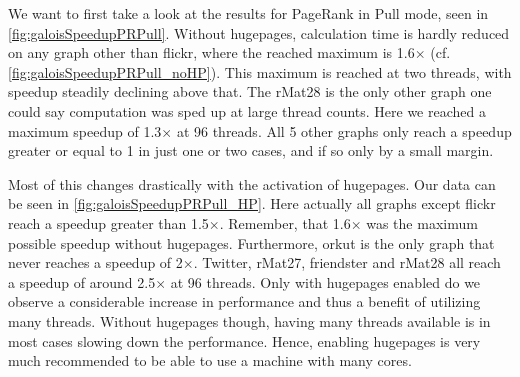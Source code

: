 We want to first take a look at the results for PageRank in Pull mode, seen in \autoref{fig:galoisSpeedupPRPull}. Without hugepages, calculation time is hardly reduced on any graph other than flickr, where the reached maximum is 1.6$\times$ (cf. \autoref{fig:galoisSpeedupPRPull_noHP}). This maximum is reached at two threads, with speedup steadily declining above that.
The rMat28 is the only other graph one could say computation was sped up at large thread counts. Here we reached a maximum speedup of 1.3$\times$ at 96 threads.
All 5 other graphs only reach a speedup greater or equal to 1 in just one or two cases, and if so only by a small margin.

Most of this changes drastically with the activation of hugepages. Our data can be seen in \autoref{fig:galoisSpeedupPRPull_HP}. 
Here actually all graphs except flickr reach a speedup greater than 1.5$\times$. Remember, that 1.6$\times$ was the maximum possible speedup without hugepages.
Furthermore, orkut is the only graph that never reaches a speedup of 2$\times$.
Twitter, rMat27, friendster and rMat28 all reach a speedup of around 2.5$\times$ at 96 threads.
Only with hugepages enabled do we observe a considerable increase in performance and thus a benefit of utilizing many threads.
Without hugepages though, having many threads available is in most cases slowing down the performance. Hence, enabling hugepages is very much recommended to be able to use a machine with many cores.

